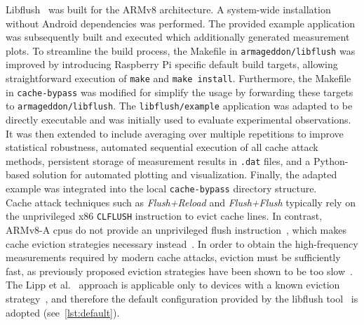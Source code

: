         Libflush~\cite{toolArmageddon} was built for the ARMv8 architecture.
        A system-wide installation without Android dependencies was performed. The provided example application was subsequently 
        built and executed
        which additionally generated measurement plots. To streamline the build process, the Makefile in 
        \texttt{armageddon/libflush} was improved by introducing Raspberry Pi specific default build targets, allowing 
        straightforward execution of \texttt{make} and \texttt{make install}. Furthermore, the Makefile in 
        \texttt{cache-bypass} was modified for simplify the usage by forwarding these targets to \texttt{armageddon/libflush}. The \texttt{libflush/example} 
        application was adapted to be directly executable and was initially used to evaluate experimental observations. 
        It was then extended to include averaging over multiple repetitions to improve statistical robustness, automated 
        sequential execution of all cache attack methods, persistent storage of measurement results in \texttt{.dat} 
        files, and a Python-based solution for automated plotting and visualization. Finally, the adapted example was 
        integrated into the local \texttt{cache-bypass} directory structure.
        \\
        Cache attack techniques such as \textit{Flush+Reload} and \textit{Flush+Flush} typically rely on the 
        unprivileged x86 \texttt{CLFLUSH} instruction to evict cache lines. In contrast, ARMv8-A \gls{cpu}s do 
        not provide an unprivileged flush instruction~\cite{paperDrammer}, which makes cache eviction strategies necessary instead~\cite{thesisCacheAttacksandRH}. 
        In order to obtain the high-frequency measurements required by modern cache attacks, eviction must be 
        sufficiently fast, as previously proposed eviction strategies have been shown to be too slow~\cite{paperCacheAccessPattern}. 
        The Lipp et al.~\cite{paperARMageddon,toolArmageddon} approach is 
        applicable only to devices with a known eviction strategy~\cite{thesisDRAMA}, and therefore the default configuration 
        provided by the libflush tool~\cite{toolArmageddon} is adopted (see~\cref{lst:default}).
        

